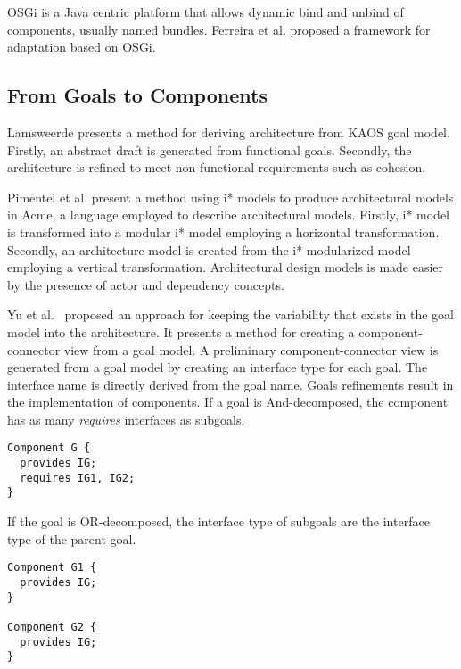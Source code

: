 OSGi\cite{the_osgi_alliance_osgi_2007} is a Java centric platform that allows dynamic bind and unbind of components, usually named bundles. Ferreira et al.\cite{ferreira_-osgi:_2012} proposed a framework for adaptation based on OSGi.

\subsection{From Goals to Components}

Lamsweerde \cite{van_lamsweerde_system_2003} presents a method for deriving architecture from KAOS goal model\cite{dardenne_goal-directed_1993}. Firstly, an abstract draft is generated from functional goals. Secondly, the architecture is refined to meet non-functional requirements such as cohesion.

Pimentel et al. \cite{pimentel_deriving_2012} present a method  using i* models to produce architectural models in Acme, a language employed to describe architectural models.  Firstly, i* model is transformed into a modular i* model employing a horizontal transformation. Secondly, an architecture model is created from the i* modularized model employing a vertical transformation. Architectural design models is made easier by the
presence of actor and dependency concepts.

Yu et al.~\cite{yu_goals_2008} proposed an approach for keeping the variability that exists in the goal model into the architecture.
It presents a method for creating a component-connector view from a goal model.
A preliminary component-connector view is generated from a goal model by creating an interface type for each goal. The interface name is directly derived from the goal name. Goals refinements result in the implementation of components.
If a goal is And-decomposed, the component has as many \emph{requires} interfaces as subgoals.

\begin{lstlisting}
Component G {
  provides IG;
  requires IG1, IG2;
}
\end{lstlisting}

If the goal is OR-decomposed, the interface type of subgoals are the interface type of the parent goal.

\begin{lstlisting}
Component G1 {
  provides IG;
}

Component G2 {
  provides IG;
}
\end{lstlisting}

